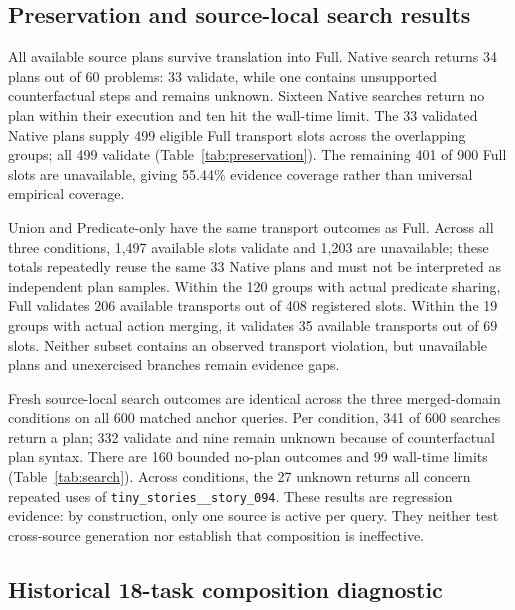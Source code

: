 \subsection{Preservation and source-local search results}

All available source plans survive translation into Full. Native search returns 34 plans out of 60 problems: 33 validate, while one contains unsupported counterfactual steps and remains unknown. Sixteen Native searches return no plan within their execution and ten hit the wall-time limit. The 33 validated Native plans supply 499 eligible Full transport slots across the overlapping groups; all 499 validate (Table~\ref{tab:preservation}). The remaining 401 of 900 Full slots are unavailable, giving 55.44\% evidence coverage rather than universal empirical coverage.



Union and Predicate-only have the same transport outcomes as Full. Across all three conditions, 1,497 available slots validate and 1,203 are unavailable; these totals repeatedly reuse the same 33 Native plans and must not be interpreted as independent plan samples. Within the 120 groups with actual predicate sharing, Full validates 206 available transports out of 408 registered slots. Within the 19 groups with actual action merging, it validates 35 available transports out of 69 slots. Neither subset contains an observed transport violation, but unavailable plans and unexercised branches remain evidence gaps.

Fresh source-local search outcomes are identical across the three merged-domain conditions on all 600 matched anchor queries. Per condition, 341 of 600 searches return a plan; 332 validate and nine remain unknown because of counterfactual plan syntax. There are 160 bounded no-plan outcomes and 99 wall-time limits (Table~\ref{tab:search}). Across conditions, the 27 unknown returns all concern repeated uses of \texttt{tiny\_stories\_\_story\_094}. These results are regression evidence: by construction, only one source is active per query. They neither test cross-source generation nor establish that composition is ineffective.



\subsection{Historical 18-task composition diagnostic}

